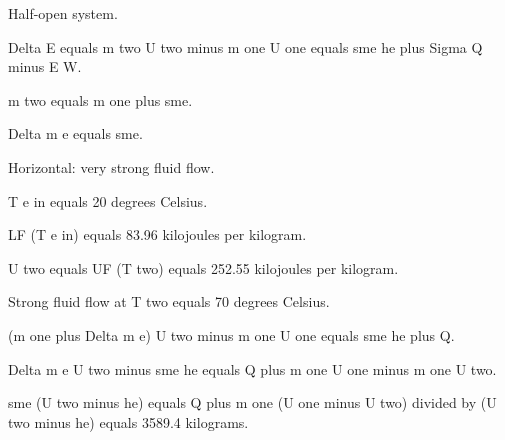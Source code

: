 Half-open system.

Delta E equals m two U two minus m one U one equals sme he plus Sigma Q minus E W.

m two equals m one plus sme.

Delta m e equals sme.

Horizontal: very strong fluid flow.

T e in equals 20 degrees Celsius.

LF (T e in) equals 83.96 kilojoules per kilogram.

U two equals UF (T two) equals 252.55 kilojoules per kilogram.

Strong fluid flow at T two equals 70 degrees Celsius.

(m one plus Delta m e) U two minus m one U one equals sme he plus Q.

Delta m e U two minus sme he equals Q plus m one U one minus m one U two.

sme (U two minus he) equals Q plus m one (U one minus U two) divided by (U two minus he) equals 3589.4 kilograms.